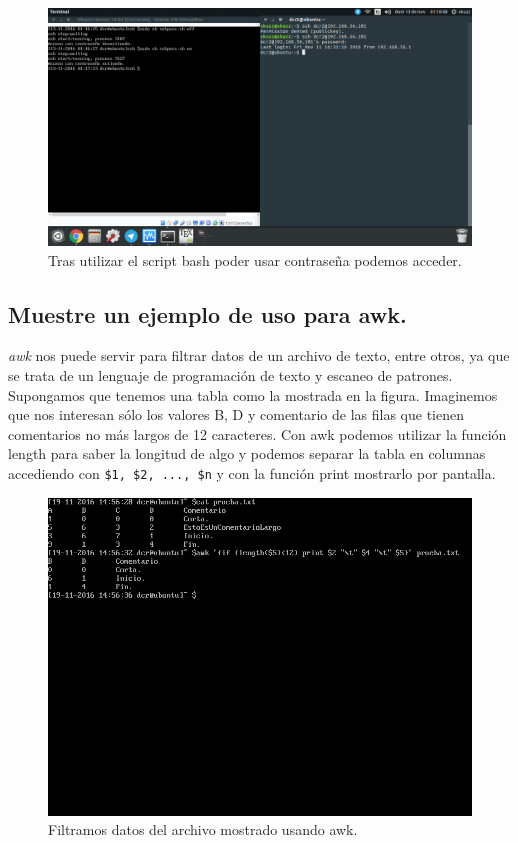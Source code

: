 \begin{flushleft}
\begin{figure}[H]
	\centering
	\includegraphics[scale=0.3]{shon.png}
	\caption{Tras utilizar el script bash poder usar contraseña podemos acceder.}
\end{figure}

\subsection{Muestre un ejemplo de uso para awk.}
\textit{awk} \cite{c15c} nos puede servir para filtrar datos de un archivo de texto, entre otros, ya que se trata de un lenguaje de programación de texto y escaneo de patrones. Supongamos que tenemos una tabla como la mostrada en la figura. Imaginemos que nos interesan sólo los valores B, D y comentario de las filas que tienen comentarios no más largos de 12 caracteres. Con awk podemos utilizar la función length para saber la longitud de algo y podemos separar la tabla en columnas accediendo con \verb|$1, $2, ..., $n| y con la función print mostrarlo por pantalla.

\begin{figure}[H]
	\centering
	\includegraphics[scale=0.4]{awk.png}
	\caption{Filtramos datos del archivo mostrado usando awk.}
\end{figure}


\end{flushleft}
